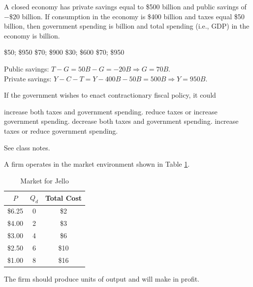 \documentclass[addpoints,11pt]{exam}
\theoremstyle{definition}
\newcommand{\blank}[0]{\underline{\hspace{3cm}}}
\begin{document}
\begin{questions}
\question A closed economy has private savings equal to \$500 billion and public savings of $-\$20$ billion. If consumption in the economy is \$400 billion and taxes equal \$50 billion, then government spending is \blank billion and total spending (i.e., GDP) in the economy is \blank billion.

\begin{choices}
\choice \$50; \$950
\choice \$70; \$900
\choice \$30; \$600
\CorrectChoice \$70; \$950
\end{choices}

\begin{solution}
Public savings: $T - G = 50B - G = -20B \Rightarrow G = 70B$. \\
Private savings: $Y - C - T = Y - 400B - 50B = 500B \Rightarrow Y = 950B$.
\end{solution}

\question If the government wishes to enact contractionary fiscal policy, it could

\begin{choices}
\choice increase both taxes and government spending. 
\choice reduce taxes or increase government spending.
\choice decrease both taxes and government spending.
\CorrectChoice increase taxes or reduce government spending.
\end{choices}

\begin{solution}
See class notes.
\end{solution}

\newpage

\question A firm operates in the market environment shown in Table \ref{tab4}. 

	\begin{table}[h!]
		\caption{Market for Jello}
		\label{tab4}
		\centering
		\begin{tabular}{ c|c|c} 
			
			$P$ & $Q_d$ & Total Cost \\
			\hline
			\$6.25 & 0 & \$2  \\
			\$4.00 & 2 & \$3 \\
			\$3.00 & 4 & \$6 \\
			\$2.50 & 6 & \$10\\
			\$1.00 & 8 & \$16  \\
		\end{tabular}
	\end{table}
	
The firm should produce \blank units of output and will make \blank in profit.
	

\end{questions}
\end{document}
